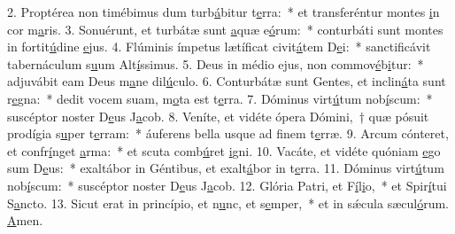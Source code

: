 2. Proptérea non timébimus dum turb\uline{á}bitur t\uline{e}rra:~* et transferéntur montes \uline{i}n cor m\uline{a}ris.
3. Sonuérunt, et turbátæ sunt \uline{a}quæ e\uline{ó}rum:~* conturbáti sunt montes in fortit\uline{ú}dine \uline{e}jus.
4. Flúminis ímpetus lætíficat civit\uline{á}tem D\uline{e}i:~* sanctificávit tabernáculum s\uline{u}um Alt\uline{í}ssimus.
5. Deus in médio ejus, non commov\uline{é}b\uline{i}tur:~* adjuvábit eam Deus m\uline{a}ne dil\uline{ú}culo.
6. Conturbátæ sunt Gentes, et inclin\uline{á}ta sunt r\uline{e}gna:~* dedit vocem suam, m\uline{o}ta est t\uline{e}rra.
7. Dóminus virt\uline{ú}tum nob\uline{í}scum:~* suscéptor noster D\uline{e}us J\uline{a}cob.
8. Veníte, et vidéte ópera Dómini,~† quæ pósuit prodígia s\uline{u}per t\uline{e}rram:~* áuferens bella usque ad f\uline{i}nem t\uline{e}rræ.
9. Arcum cónteret, et confr\uline{í}nget \uline{a}rma:~* et scuta comb\uline{ú}ret \uline{i}gni.
10. Vacáte, et vidéte quóniam \uline{e}go sum D\uline{e}us:~* exaltábor in Géntibus, et exalt\uline{á}bor in t\uline{e}rra.
11. Dóminus virt\uline{ú}tum nob\uline{í}scum:~* suscéptor noster D\uline{e}us J\uline{a}cob.
12. Glória Patri, et F\uline{í}l\uline{i}o,~* et Spir\uline{í}tui S\uline{a}ncto.
13. Sicut erat in princípio, et n\uline{u}nc, et s\uline{e}mper,~* et in sǽcula sæcul\uline{ó}rum. \uline{A}men.
